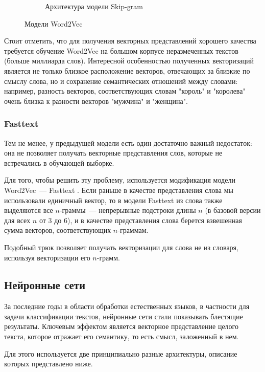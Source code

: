 \documentclass[../diploma.tex]{subfiles}
\begin{document}
\begin{figure}[ht]
\begin{subfigure}{0.49\linewidth}
        	\caption{\label{second}Архитектура модели Skip-gram}
        	\label{fig:skip-gram}
        \end{subfigure}
     	\caption{Модели Word2Vec}
    \end{figure}

    Стоит отметить, что для получения векторных представлений хорошего качества требуется обучение Word2Vec на большом корпусе неразмеченных текстов 
    (больше миллиарда слов).
    Интересной особенностью полученных векторизаций является не только близкое расположение векторов, отвечающих за близкие по смыслу слова, 
    но и сохранение семантических отношений между словами: 
    например, разность векторов, соответствующих словам "король" и "королева" очень близка к разности векторов "мужчина" и "женщина".   

	\subsubsection{Fasttext}  

    Тем не менее, у предыдущей модели есть один достаточно важный недостаток: 
    она не позволяет получать векторные представления слов, которые не встречались в обучающей выборке.
    
    Для того, чтобы решить эту проблему, используется модификация модели Word2Vec~--- Fasttext \cite{article:fasttext}.
    Если раньше в качестве представления слова мы использовали единичный вектор, 
    то в модели Fasttext из слова также выделяются все $n$-граммы~--- непрерывные подстроки длины $n$ (в базовой версии для всех $n$ от $3$ до $6$), 
    и в качестве представления слова берется взвешенная сумма векторов, соответствующих $n$-граммам.

    Подобный трюк позволяет получать векторизации для слова не из словаря, используя векторизации его $n$-грамм.

    \subsection{Нейронные сети}

    \label{subsec:neural_nets}

    За последние годы в области обработки естественных языков, в частности для задачи классификации текстов, нейронные сети стали показывать блестящие результаты.
    Ключевым эффектом является векторное представление целого текста, которое отражает его семантику, то есть смысл, заложенный в нем.

    Для этого используется две принципиально разные архитектуры, описание которых представлено ниже.
\end{document}
